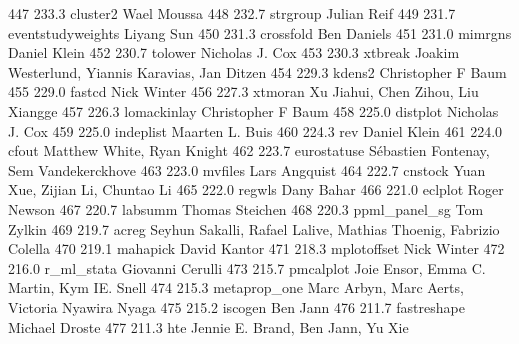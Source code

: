    447    233.3    cluster2      Wael Moussa                             
   448    232.7    strgroup      Julian Reif                             
   449    231.7    eventstudyweights  Liyang Sun                              
   450    231.3    crossfold     Ben Daniels                             
   451    231.0    mimrgns       Daniel Klein                            
   452    230.7    tolower       Nicholas J. Cox                         
   453    230.3    xtbreak       Joakim Westerlund, Yiannis Karavias,    
                                   Jan Ditzen                              
   454    229.3    kdens2        Christopher F Baum                      
   455    229.0    fastcd        Nick Winter                             
   456    227.3    xtmoran       Xu Jiahui, Chen  Zihou, Liu Xiangge     
   457    226.3    lomackinlay   Christopher F Baum                      
   458    225.0    distplot      Nicholas J. Cox                         
   459    225.0    indeplist     Maarten L. Buis                         
   460    224.3    rev           Daniel Klein                            
   461    224.0    cfout         Matthew White, Ryan Knight              
   462    223.7    eurostatuse   Sébastien Fontenay, Sem Vandekerckhove 
   463    223.0    mvfiles       Lars Angquist                           
   464    222.7    cnstock       Yuan Xue, Zijian Li, Chuntao Li         
   465    222.0    regwls        Dany Bahar                              
   466    221.0    eclplot       Roger Newson                            
   467    220.7    labsumm       Thomas Steichen                         
   468    220.3    ppml_panel_sg  Tom Zylkin                              
   469    219.7    acreg         Seyhun Sakalli, Rafael Lalive, Mathias  
                                   Thoenig, Fabrizio Colella               
   470    219.1    mahapick      David Kantor                            
   471    218.3    mplotoffset   Nick Winter                             
   472    216.0    r_ml_stata    Giovanni Cerulli                        
   473    215.7    pmcalplot     Joie Ensor, Emma C. Martin, Kym IE.     
                                   Snell                                   
   474    215.3    metaprop_one  Marc Arbyn, Marc Aerts, Victoria        
                                   Nyawira Nyaga                           
   475    215.2    iscogen       Ben Jann                                
   476    211.7    fastreshape   Michael Droste                          
   477    211.3    hte           Jennie E. Brand, Ben Jann, Yu Xie       
